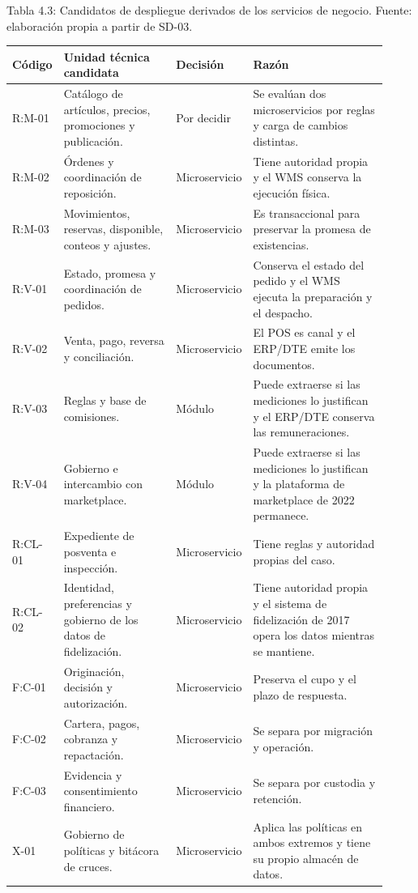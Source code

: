 \documentclass[11pt]{article}
\begin{document}
Tabla 4.3: Candidatos de despliegue derivados de los servicios de negocio. Fuente: elaboración propia a partir de SD-03.\par\nopagebreak
\begin{longtable}{@{}p{0.10\linewidth}p{0.30\linewidth}p{0.16\linewidth}p{0.36\linewidth}@{}}
\toprule Código & Unidad técnica candidata & Decisión & Razón \\
\midrule\endhead\bottomrule\endlastfoot
R:M-01 & Catálogo de artículos, precios, promociones y publicación. & Por decidir & Se evalúan dos microservicios por reglas y carga de cambios distintas. \\
R:M-02 & Órdenes y coordinación de reposición. & Microservicio & Tiene autoridad propia y el WMS conserva la ejecución física. \\
R:M-03 & Movimientos, reservas, disponible, conteos y ajustes. & Microservicio & Es transaccional para preservar la promesa de existencias. \\
R:V-01 & Estado, promesa y coordinación de pedidos. & Microservicio & Conserva el estado del pedido y el WMS ejecuta la preparación y el despacho. \\
R:V-02 & Venta, pago, reversa y conciliación. & Microservicio & El POS es canal y el ERP/DTE emite los documentos. \\
R:V-03 & Reglas y base de comisiones. & Módulo & Puede extraerse si las mediciones lo justifican y el ERP/DTE conserva las remuneraciones. \\
R:V-04 & Gobierno e intercambio con marketplace. & Módulo & Puede extraerse si las mediciones lo justifican y la plataforma de marketplace de 2022 permanece. \\
R:CL-01 & Expediente de posventa e inspección. & Microservicio & Tiene reglas y autoridad propias del caso. \\
R:CL-02 & Identidad, preferencias y gobierno de los datos de fidelización. & Microservicio & Tiene autoridad propia y el sistema de fidelización de 2017 opera los datos mientras se mantiene. \\
F:C-01 & Originación, decisión y autorización. & Microservicio & Preserva el cupo y el plazo de respuesta. \\
F:C-02 & Cartera, pagos, cobranza y repactación. & Microservicio & Se separa por migración y operación. \\
F:C-03 & Evidencia y consentimiento financiero. & Microservicio & Se separa por custodia y retención. \\
X-01 & Gobierno de políticas y bitácora de cruces. & Microservicio & Aplica las políticas en ambos extremos y tiene su propio almacén de datos. \\
\end{longtable}
\end{document}
